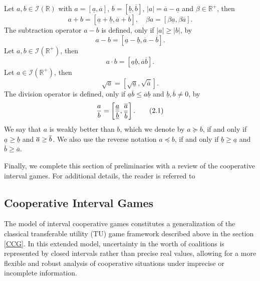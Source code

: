 \documentclass[12pt]{article}
\begin{document}
\noindent Let $a,b\in \mathcal{I}(\mathbb{R})$ with $a=[\underline{a},%
\overline{a}]$, $b=[\underline{b},\overline{b}]$, $|a|=\overline{a}-%
\underline{a}$ and $\beta \in \mathbb{R}^{+}$, then  
\begin{equation*}
a+b=[\underline{a}+\underline{b},\overline{a}+\overline{b}],\quad \beta
a=[\beta \underline{a},\beta \overline{a}].
\end{equation*}%
\noindent The subtraction operator $a-b$ is defined, only if $|a|\geq |b|$,
by 
\begin{equation*}
a-b=[\underline{a}-\underline{b},\overline{a}-\overline{b}].
\end{equation*}%
\noindent Let $a,b\in \mathcal{I}(\mathbb{R}^{+})$, then  
\begin{equation*}
a\cdot b=[\underline{a}\underline{b},\overline{a}\overline{b}].
\end{equation*}%
\noindent Let $a\in \mathcal{I}(\mathbb{R}^{+})$, then  
\begin{equation*}
\sqrt{a}=[\sqrt{\underline{a}},\sqrt{\overline{a}}].
\end{equation*}%
\noindent The division operator is defined, only if $\underline{a}\overline{b%
}\leq \overline{a}\underline{b}$ and $\underline{b},\overline{b}\neq 0$, by 
\begin{equation}
\frac{a}{b}=\left[ \frac{\underline{a}}{\underline{b}},\frac{\overline{a}}{%
\overline{b}}\right] .  \tag{$2.1$}
\end{equation}%
\noindent We say that $a$ is weakly better than $b$, which we denote by $%
a\succeq b$, if and only if $\underline{a}\geq \underline{b}$ and $\overline{%
a}\geq \overline{b}$. We also use the reverse notation $a\preceq b$, if and
only if $\underline{b}\geq \underline{a}$ and $\overline{b}\geq \overline{a}$.

\noindent Finally, we complete this section of preliminaries with a review of the cooperative interval games. For additional details, the reader is referred to \cite{Alparslan2009,Alparslan2010Axiomatization,Alparslan2010Book,Alparslan2011SetValued,Alparslan2013Sequencing,Alparslan2014Mountain,Branzei2011Convexity}


\subsection{Cooperative Interval Games} \label{CIG}

\noindent The model of interval cooperative games constitutes a generalization of the classical transferable utility (TU) game framework described above in the section \ref{CCG}. In this extended model, uncertainty in the worth of coalitions is represented by closed intervals rather than precise real values, allowing for a more flexible and robust analysis of cooperative situations under imprecise or incomplete information.
\end{document}
